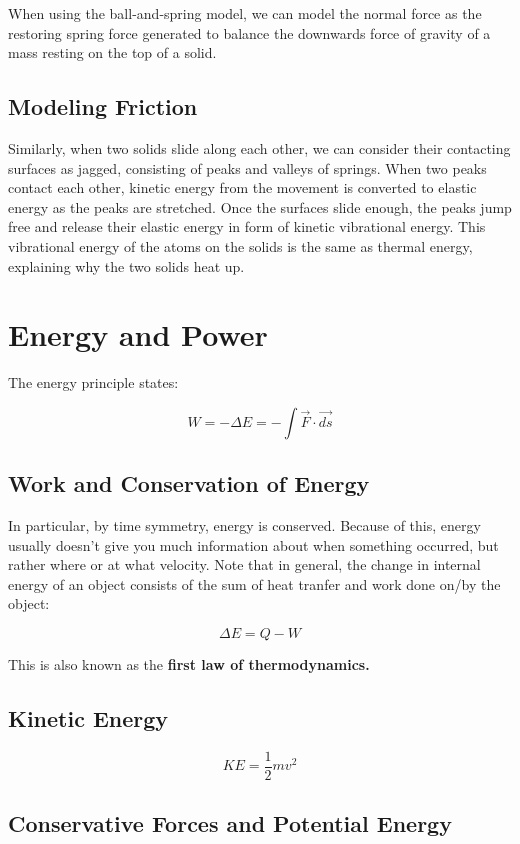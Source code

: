 \documentclass{article}
\begin{document}
When using the ball-and-spring model, we can model the normal force as the restoring spring force generated to balance the downwards force of gravity of a mass resting on the top of a solid.

\subsection{Modeling Friction}

Similarly, when two solids slide along each other, we can consider their contacting surfaces as jagged, consisting of peaks and valleys of springs. When two peaks contact each other, kinetic energy from the movement is converted to elastic energy as the peaks are stretched. Once the surfaces slide enough, the peaks jump free and release their elastic energy in form of kinetic vibrational energy. This vibrational energy of the atoms on the solids is the same as thermal energy, explaining why the two solids heat up.

\pagebreak\section{Energy and Power}

The energy principle states:

$$W=-\Delta E= -\int \vec{F}\cdot \vec{ds}$$

\subsection{Work and Conservation of Energy}
In particular, by time symmetry, energy is conserved. Because of this, energy usually doesn't give you much information about when something occurred, but rather where or at what velocity. Note that in general, the change in internal energy of an object consists of the sum of heat tranfer and work done on/by the object:

$$\Delta E = Q-W$$

This is also known as the \textbf{first law of thermodynamics.}

\subsection{Kinetic Energy}

$$KE=\frac{1}{2}mv^2$$

\subsection{Conservative Forces and Potential Energy}
\end{document}
